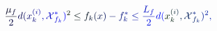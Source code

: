 \documentclass[12pt]{article}
\begin{document}
\makeatletter
\renewcommand*{\@textcolor}[3]{%
  \protect\leavevmode
  \begingroup
    \color#1{#2}#3%
  \endgroup
}
\makeatother
\begin{displaymath}
\mathcolor[RGB]{0,0,15}{\frac { \mathcolor[RGB]{0,0,30}{\mu} _ { \mathcolor[RGB]{0,0,45}{f} } } { \mathcolor[RGB]{0,0,60}{2} } } \mathcolor[RGB]{0,0,75}{d} \mathcolor[RGB]{0,0,90}{(} \mathcolor[RGB]{0,0,105}{x} _ { \mathcolor[RGB]{0,0,120}{k} } ^ { \mathcolor[RGB]{0,0,135}{(} \mathcolor[RGB]{0,0,150}{i} \mathcolor[RGB]{0,0,165}{)} } \mathcolor[RGB]{0,0,180}{,} \mathcal { \mathcolor[RGB]{0,0,195}{X} } _ { \mathcolor[RGB]{0,0,210}{f} _ { \mathcolor[RGB]{0,0,225}{k} } } ^ { \mathcolor[RGB]{0,0,240}{*} } \mathcolor[RGB]{0,0,255}{)} ^ { \mathcolor[RGB]{0,15,0}{2} } \mathcolor[RGB]{0,15,15}{\leq} \mathcolor[RGB]{0,15,30}{f} _ { \mathcolor[RGB]{0,15,45}{k} } \mathcolor[RGB]{0,15,60}{(} \mathcolor[RGB]{0,15,75}{x} \mathcolor[RGB]{0,15,90}{)} \mathcolor[RGB]{0,15,105}{-} \mathcolor[RGB]{0,15,120}{f} _ { \mathcolor[RGB]{0,15,135}{k} } ^ { \mathcolor[RGB]{0,15,150}{*} } \mathcolor[RGB]{0,15,165}{\leq} \mathcolor[RGB]{0,15,180}{\frac { \mathcolor[RGB]{0,15,195}{L} _ { \mathcolor[RGB]{0,15,210}{f} } } { \mathcolor[RGB]{0,15,225}{2} } } \mathcolor[RGB]{0,15,240}{d} \mathcolor[RGB]{0,15,255}{(} \mathcolor[RGB]{0,30,0}{x} _ { \mathcolor[RGB]{0,30,15}{k} } ^ { \mathcolor[RGB]{0,30,30}{(} \mathcolor[RGB]{0,30,45}{i} \mathcolor[RGB]{0,30,60}{)} } \mathcolor[RGB]{0,30,75}{,} \mathcal { \mathcolor[RGB]{0,30,90}{X} } _ { \mathcolor[RGB]{0,30,105}{f} _ { \mathcolor[RGB]{0,30,120}{k} } } ^ { \mathcolor[RGB]{0,30,135}{*} } \mathcolor[RGB]{0,30,150}{)} ^ { \mathcolor[RGB]{0,30,165}{2} } \mathcolor[RGB]{0,30,180}{,}
\end{displaymath}
\end{document}
